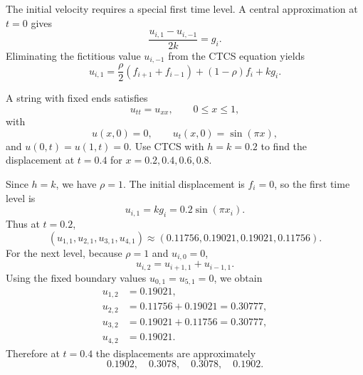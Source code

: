 The initial velocity requires a special first time level.  A central approximation at $t=0$ gives
\[
 \frac{u_{i,1}-u_{i,-1}}{2k}=g_i.
\]
Eliminating the fictitious value $u_{i,-1}$ from the CTCS equation yields
\[
 u_{i,1}
 =\frac\rho2(f_{i+1}+f_{i-1})
 +(1-\rho)f_i+kg_i.
\]

\begin{example}
A string with fixed ends satisfies
\[
 u_{tt}=u_{xx},
 \qquad0\le x\le1,
\]
with
\[
 u(x,0)=0,
 \qquad
 u_t(x,0)=\sin(\pi x),
\]
and $u(0,t)=u(1,t)=0$.  Use CTCS with $h=k=0.2$ to find the displacement at $t=0.4$ for
$x=0.2,0.4,0.6,0.8$.
\end{example}

\begin{solution}[6.2cm]
Since $h=k$, we have $\rho=1$.  The initial displacement is $f_i=0$, so the first time level is
\[
 u_{i,1}=kg_i=0.2\sin(\pi x_i).
\]
Thus at $t=0.2$,
\[
 (u_{1,1},u_{2,1},u_{3,1},u_{4,1})
 \approx(0.11756,0.19021,0.19021,0.11756).
\]
For the next level, because $\rho=1$ and $u_{i,0}=0$,
\[
 u_{i,2}=u_{i+1,1}+u_{i-1,1}.
\]
Using the fixed boundary values $u_{0,1}=u_{5,1}=0$, we obtain
\[
\begin{aligned}
 u_{1,2}&=0.19021,\\
 u_{2,2}&=0.11756+0.19021=0.30777,\\
 u_{3,2}&=0.19021+0.11756=0.30777,\\
 u_{4,2}&=0.19021.
\end{aligned}
\]
Therefore at $t=0.4$ the displacements are approximately
\[
 0.1902,
 \quad0.3078,
 \quad0.3078,
 \quad0.1902.
\]
\end{solution}
